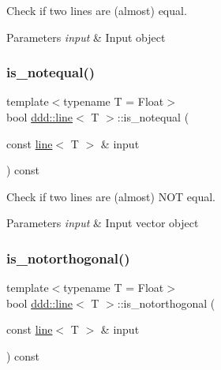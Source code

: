 Check if two lines are (almost) equal. 


\begin{DoxyParams}{Parameters}
{\em input} & Input object \\
\hline
\end{DoxyParams}
\mbox{\label{classddd_1_1line_addea61f32ab9aad4abf390bea633fd3c}} 
\subsubsection{\texorpdfstring{is\+\_\+notequal()}{is\_notequal()}}
{\footnotesize\ttfamily template$<$typename T = Float$>$ \\
bool \hyperlink{classddd_1_1line}{ddd\+::line}$<$ T $>$\+::is\+\_\+notequal (\begin{DoxyParamCaption}\item[{const \hyperlink{classddd_1_1line}{line}$<$ T $>$ \&}]{input }\end{DoxyParamCaption}) const\hspace{0.3cm}{\ttfamily [inline]}}



Check if two lines are (almost) N\+OT equal. 


\begin{DoxyParams}{Parameters}
{\em input} & Input vector object \\
\hline
\end{DoxyParams}
\mbox{\label{classddd_1_1line_a123c95c4ec684dc8b56fff2f9b9f4ac1}} 
\subsubsection{\texorpdfstring{is\+\_\+notorthogonal()}{is\_notorthogonal()}}
{\footnotesize\ttfamily template$<$typename T = Float$>$ \\
bool \hyperlink{classddd_1_1line}{ddd\+::line}$<$ T $>$\+::is\+\_\+notorthogonal (\begin{DoxyParamCaption}\item[{const \hyperlink{classddd_1_1line}{line}$<$ T $>$ \&}]{input }\end{DoxyParamCaption}) const\hspace{0.3cm}{\ttfamily [inline]}}



